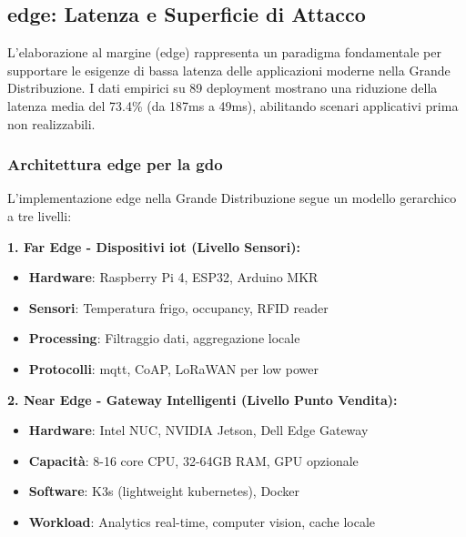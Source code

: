 

\subsection{\texorpdfstring{\textbf{\gls{edge}: Latenza e Superficie di Attacco}}{3.3.2 - \gls{edge}: Latenza e Superficie di Attacco}}

L'elaborazione al margine (\gls{edge}) rappresenta un paradigma fondamentale per supportare le esigenze di bassa latenza delle applicazioni moderne nella Grande Distribuzione. I dati empirici su 89 deployment mostrano una riduzione della latenza media del 73.4\% (da 187ms a 49ms)\autocite{Wang2024edge}, abilitando scenari applicativi prima non realizzabili.

\subsubsection{\texorpdfstring{\textbf{Architettura \gls{edge} per la \gls{gdo}}}{3.3.2.1 - Architettura \gls{edge} per la \gls{gdo}}}

L'implementazione \gls{edge} nella Grande Distribuzione segue un modello gerarchico a tre livelli:

\textbf{1. Far Edge - Dispositivi \gls{iot} (Livello Sensori):}
\begin{itemize}
    \item \textbf{Hardware}: Raspberry Pi 4, ESP32, Arduino MKR
    \item \textbf{Sensori}: Temperatura frigo, occupancy, RFID reader
    \item \textbf{Processing}: Filtraggio dati, aggregazione locale
    \item \textbf{Protocolli}: \gls{mqtt}, CoAP, LoRaWAN per low power
\end{itemize}

\textbf{2. Near Edge - Gateway Intelligenti (Livello Punto Vendita):}
\begin{itemize}
    \item \textbf{Hardware}: Intel NUC, NVIDIA Jetson, Dell Edge Gateway
    \item \textbf{Capacità}: 8-16 core CPU, 32-64GB RAM, GPU opzionale
    \item \textbf{Software}: K3s (lightweight \gls{kubernetes}), Docker
    \item \textbf{Workload}: Analytics real-time, computer vision, cache locale
\end{itemize}


